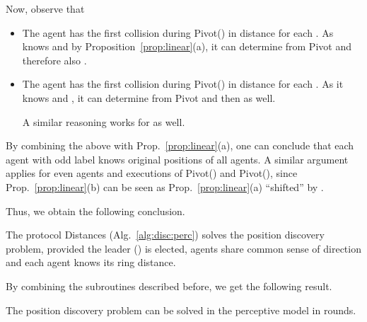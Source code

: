 \else
{}
\fi
Now, observe that
\begin{itemize}
\item
The agent  has the first collision during Pivot() in distance
 for each .
As  knows  and  by Proposition~\ref{prop:linear}(a), it can determine  from Pivot and 
therefore also .
\item
The agent  has the first collision during Pivot() in distance
 for each .
As it knows  and , it can
determine  from Pivot and then  as well.


A similar reasoning works for  as well.
\end{itemize}
By combining the above with Prop.~\ref{prop:linear}(a), one can conclude that each 
agent  with odd label  knows original positions of all agents. A similar argument
applies for even agents and executions of Pivot() and Pivot(),
since Prop.~\ref{prop:linear}(b) can be seen as Prop.~\ref{prop:linear}(a) ``shifted'' by .

\iffull
Thus, we obtain the following conclusion.
\else
\fi
\begin{lemma}
The protocol Distances (Alg.~\ref{alg:disc:perc}) solves the position discovery problem, provided
the leader () is elected, agents share common sense of direction
and each agent knows its ring distance.
\end{lemma}

\iffull
By combining the subroutines described before, we get the following result.
\fi
\begin{theorem}
The position discovery problem can be solved in the perceptive model
in  rounds.
\end{theorem}

